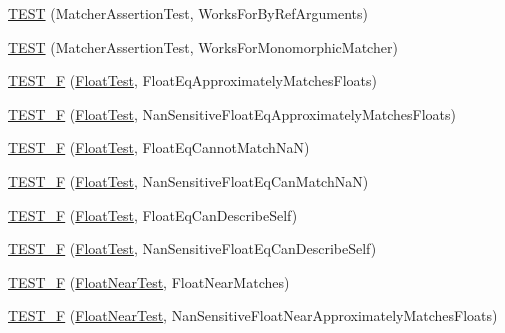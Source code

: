 \begin{DoxyCompactItemize}
\item 
\hyperlink{namespacetesting_1_1gmock__matchers__test_afcf1287c7fd759157367026613ddd727}{T\+E\+ST} (Matcher\+Assertion\+Test, Works\+For\+By\+Ref\+Arguments)
\item 
\hyperlink{namespacetesting_1_1gmock__matchers__test_a0fe4bde05f667c4877e3b4a4a7bde002}{T\+E\+ST} (Matcher\+Assertion\+Test, Works\+For\+Monomorphic\+Matcher)
\item 
\hyperlink{namespacetesting_1_1gmock__matchers__test_a69257e935b4334c835b3ad26acea9104}{T\+E\+S\+T\+\_\+F} (\hyperlink{namespacetesting_1_1gmock__matchers__test_a145329e433869625f9f0e98a0cdfd7b4}{Float\+Test}, Float\+Eq\+Approximately\+Matches\+Floats)
\item 
\hyperlink{namespacetesting_1_1gmock__matchers__test_abb691880cd22f6f444c978547b13f792}{T\+E\+S\+T\+\_\+F} (\hyperlink{namespacetesting_1_1gmock__matchers__test_a145329e433869625f9f0e98a0cdfd7b4}{Float\+Test}, Nan\+Sensitive\+Float\+Eq\+Approximately\+Matches\+Floats)
\item 
\hyperlink{namespacetesting_1_1gmock__matchers__test_a111f0c8a5ec17b47e8eb6226e1c2cb58}{T\+E\+S\+T\+\_\+F} (\hyperlink{namespacetesting_1_1gmock__matchers__test_a145329e433869625f9f0e98a0cdfd7b4}{Float\+Test}, Float\+Eq\+Cannot\+Match\+NaN)
\item 
\hyperlink{namespacetesting_1_1gmock__matchers__test_a4e9d89902e088a10915b4f9463ac0f09}{T\+E\+S\+T\+\_\+F} (\hyperlink{namespacetesting_1_1gmock__matchers__test_a145329e433869625f9f0e98a0cdfd7b4}{Float\+Test}, Nan\+Sensitive\+Float\+Eq\+Can\+Match\+NaN)
\item 
\hyperlink{namespacetesting_1_1gmock__matchers__test_a264de01a5019e5c358116845bf5edd14}{T\+E\+S\+T\+\_\+F} (\hyperlink{namespacetesting_1_1gmock__matchers__test_a145329e433869625f9f0e98a0cdfd7b4}{Float\+Test}, Float\+Eq\+Can\+Describe\+Self)
\item 
\hyperlink{namespacetesting_1_1gmock__matchers__test_a95a2bbc273ff70fc364c5c9c4697834c}{T\+E\+S\+T\+\_\+F} (\hyperlink{namespacetesting_1_1gmock__matchers__test_a145329e433869625f9f0e98a0cdfd7b4}{Float\+Test}, Nan\+Sensitive\+Float\+Eq\+Can\+Describe\+Self)
\item 
\hyperlink{namespacetesting_1_1gmock__matchers__test_a6897409da5003f20f891d8a5ecabdc99}{T\+E\+S\+T\+\_\+F} (\hyperlink{namespacetesting_1_1gmock__matchers__test_a426b51f464dcb48033946e1bf3cc8795}{Float\+Near\+Test}, Float\+Near\+Matches)
\item 
\hyperlink{namespacetesting_1_1gmock__matchers__test_ad396e996ed685fd80cbd78740b8d01a8}{T\+E\+S\+T\+\_\+F} (\hyperlink{namespacetesting_1_1gmock__matchers__test_a426b51f464dcb48033946e1bf3cc8795}{Float\+Near\+Test}, Nan\+Sensitive\+Float\+Near\+Approximately\+Matches\+Floats)

\end{DoxyCompactItemize}
